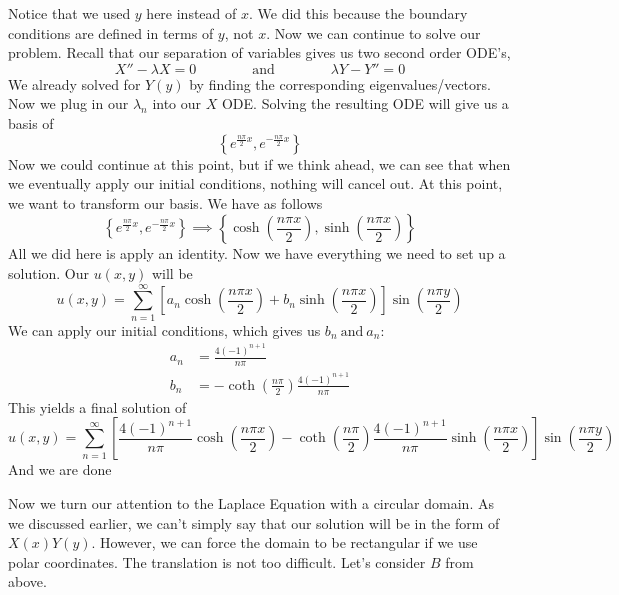\documentclass{article}
\begin{document}
Notice that we used $y$ here instead of $x$. We did this because the boundary conditions are defined in terms of $y$, not $x$. Now we can continue to solve our problem. Recall that our separation of variables gives us two second order ODE's,
\[
X'' - \lambda X = 0 \qquad\qquad \text{and} \qquad\qquad \lambda Y - Y'' = 0
\]
We already solved for $Y(y)$ by finding the corresponding eigenvalues/vectors. Now we plug in our $\lambda_{n}$ into our $X$ ODE. Solving the resulting ODE will give us a basis of
\[
\left\{ e^{\frac{n\pi}{2}x}, e^{-\frac{n\pi}{2}x} \right\}
\]
Now we could continue at this point, but if we think ahead, we can see that when we eventually apply our initial conditions, nothing will cancel out. At this point, we want to transform our basis. We have as follows
\[
\left\{ e^{\frac{n\pi}{2}x}, e^{-\frac{n\pi}{2}x} \right\} \implies \left\{ \cosh{\left(\frac{n\pi x}{2}\right)}, \sinh{\left(\frac{n\pi x}{2}\right)} \right\}
\]
All we did here is apply an identity. Now we have everything we need to set up a solution. Our $u(x,y)$ will be
\[
u(x,y) = \sum_{n=1}^{\infty}\left[a_{n}\cosh{\left(\frac{n\pi x}{2}\right)} + b_{n}\sinh{\left(\frac{n\pi x}{2}\right)}\right]\sin{\left(\frac{n\pi y}{2}\right)}
\]
We can apply our initial conditions, which gives us $b_{n}\ \text{and}\ a_{n}$:
\begin{align*}
a_{n} &= \frac{4(-1)^{n+1}}{n\pi}\\
b_{n} &= -\coth{\left(\frac{n \pi}{2}\right)}\frac{4(-1)^{n+1}}{n\pi}
\end{align*}
This yields a final solution of
\[
u(x,y) = \sum_{n=1}^{\infty}\left[ \frac{4(-1)^{n+1}}{n\pi} \cosh{\left(\frac{n\pi x}{2}\right)} -\coth{\left(\frac{n \pi}{2}\right)}\frac{4(-1)^{n+1}}{n\pi}\sinh{\left(\frac{n\pi x}{2}\right)}\right]\sin{\left(\frac{n\pi y}{2}\right)}
\]
And we are done
\newpage


\indent Now we turn our attention to the Laplace Equation with a circular domain. As we discussed earlier, we can't simply say that our solution will be in the form of $X(x)Y(y)$. However, we can force the domain to be rectangular if we use polar coordinates. The translation is not too difficult. Let's consider $B$ from above.\\\\
\end{document}
